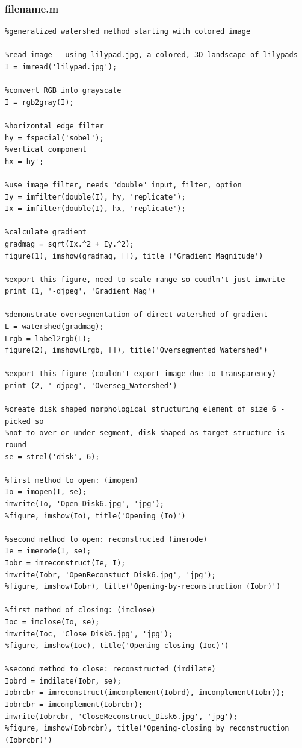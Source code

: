 \documentclass[12pt]{article}
\theoremstyle{plain}%
\theoremstyle{definition}
\theoremstyle{remark}
\begin{document}
\subsubsection{filename.m}
\begin{verbatim}
%generalized watershed method starting with colored image

%read image - using lilypad.jpg, a colored, 3D landscape of lilypads
I = imread('lilypad.jpg');

%convert RGB into grayscale
I = rgb2gray(I);

%horizontal edge filter
hy = fspecial('sobel');
%vertical component
hx = hy';

%use image filter, needs "double" input, filter, option
Iy = imfilter(double(I), hy, 'replicate');
Ix = imfilter(double(I), hx, 'replicate');

%calculate gradient
gradmag = sqrt(Ix.^2 + Iy.^2);
figure(1), imshow(gradmag, []), title ('Gradient Magnitude')

%export this figure, need to scale range so coudln't just imwrite
print (1, '-djpeg', 'Gradient_Mag')

%demonstrate oversegmentation of direct watershed of gradient
L = watershed(gradmag);
Lrgb = label2rgb(L);
figure(2), imshow(Lrgb, []), title('Oversegmented Watershed')

%export this figure (couldn't export image due to transparency)
print (2, '-djpeg', 'Overseg_Watershed')

%create disk shaped morphological structuring element of size 6 - picked so
%not to over or under segment, disk shaped as target structure is round
se = strel('disk', 6);

%first method to open: (imopen)
Io = imopen(I, se);
imwrite(Io, 'Open_Disk6.jpg', 'jpg');
%figure, imshow(Io), title('Opening (Io)')

%second method to open: reconstructed (imerode)
Ie = imerode(I, se);
Iobr = imreconstruct(Ie, I);
imwrite(Iobr, 'OpenReconstuct_Disk6.jpg', 'jpg');
%figure, imshow(Iobr), title('Opening-by-reconstruction (Iobr)')

%first method of closing: (imclose)
Ioc = imclose(Io, se);
imwrite(Ioc, 'Close_Disk6.jpg', 'jpg');
%figure, imshow(Ioc), title('Opening-closing (Ioc)')

%second method to close: reconstructed (imdilate)
Iobrd = imdilate(Iobr, se);
Iobrcbr = imreconstruct(imcomplement(Iobrd), imcomplement(Iobr));
Iobrcbr = imcomplement(Iobrcbr);
imwrite(Iobrcbr, 'CloseReconstruct_Disk6.jpg', 'jpg');
%figure, imshow(Iobrcbr), title('Opening-closing by reconstruction (Iobrcbr)')


\end{verbatim}
\end{document}
